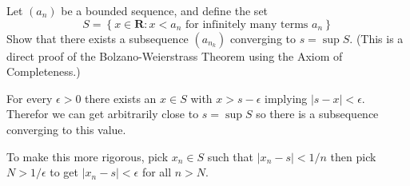 \begin{solution}
\end{solution}


\begin{exercise}
  Let $\left(a_{n}\right)$ be a bounded sequence, and define the set
  $$
  S=\left\{x \in \mathbf{R}: x<a_{n} \text { for infinitely many terms } a_{n}\right\}
  $$
  Show that there exists a subsequence $\left(a_{n_{k}}\right)$ converging to $s=\sup S$. (This is a direct proof of the Bolzano-Weierstrass Theorem using the Axiom of Completeness.)
\end{exercise}

\begin{solution}
  For every $\epsilon > 0$ there exists an $x \in S$ with $x > s - \epsilon$ implying $|s-x| < \epsilon$. Therefor we can get arbitrarily close to $s = \sup S$ so there is a subsequence converging to this value.

  To make this more rigorous, pick $x_n \in S$ such that $|x_n - s| < 1/n$ then pick $N > 1/\epsilon$ to get $|x_n - s| < \epsilon$ for all $n > N$.
\end{solution}
